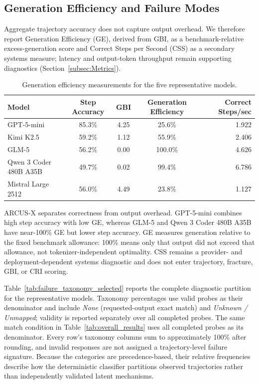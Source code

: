 \documentclass{article}
\begin{document}
\subsection{Generation Efficiency and Failure Modes}
Aggregate trajectory accuracy does not capture output overhead. We therefore report Generation Efficiency (GE), derived from GBI, as a benchmark-relative excess-generation score and Correct Steps per Second (CSS) as a secondary systems measure; latency and output-token throughput remain supporting diagnostics (Section~\ref{subsec:Metrics}).
\begin{table}[!ht]
\centering
\caption{Generation efficiency measurements for the five representative models.}
\label{tab:generation_efficiency_selected}
\scriptsize
\begin{tabular}{lcccr}
\toprule
\textbf{Model} & \textbf{Step Accuracy} & \textbf{GBI} & \textbf{Generation Efficiency} & \textbf{Correct Steps/sec} \\
\midrule
GPT-5-mini & 85.3\% & 4.25 & 25.6\% & 1.922 \\
Kimi K2.5 & 59.2\% & 1.12 & 55.9\% & 2.406 \\
GLM-5 & 56.2\% & 0.00 & 100.0\% & 4.626 \\
Qwen 3 Coder 480B A35B & 49.7\% & 0.02 & 99.4\% & 6.786 \\
Mistral Large 2512 & 56.0\% & 4.49 & 23.8\% & 1.127 \\
\bottomrule
\end{tabular}
\end{table}

ARCUS-X separates correctness from output overhead. GPT-5-mini combines high step accuracy with low GE, whereas GLM-5 and Qwen 3 Coder 480B A35B have near-100\% GE but lower step accuracy. GE measures generation relative to the fixed benchmark allowance: 100\% means only that output did not exceed that allowance, not tokenizer-independent optimality. CSS remains a provider- and deployment-dependent systems diagnostic and does not enter trajectory, fracture, GBI, or CRI scoring.

Table~\ref{tab:failure_taxonomy_selected} reports the complete diagnostic partition for the representative models. Taxonomy percentages use valid probes as their denominator and include \emph{None} (requested-output exact match) and \emph{Unknown / Unmapped}; validity is reported separately over all completed probes. The same match condition in Table~\ref{tab:overall_results} uses all completed probes as its denominator. Every row's taxonomy columns sum to approximately 100\% after rounding, and invalid responses are not assigned a trajectory-level failure signature. Because the categories are precedence-based, their relative frequencies describe how the deterministic classifier partitions observed trajectories rather than independently validated latent mechanisms.
\end{document}
